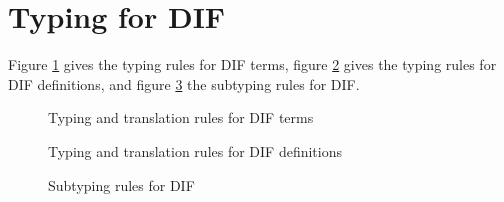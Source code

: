 \section{Typing for DIF}
Figure \ref{typing_rules_terms} gives the typing rules for DIF terms, figure
\ref{typing_rules_definitions} gives the typing rules for DIF definitions, and
figure \ref{subtyping_rules} the subtyping rules for DIF.

\begin{figure}[h]
    
    \caption{Typing and translation rules for DIF terms}
    \label{typing_rules_terms}
\end{figure}

\begin{figure}[h]
    
    \caption{Typing and translation rules for DIF definitions}
    \label{typing_rules_definitions}
\end{figure}

\begin{figure}[h]
    
    \caption{Subtyping rules for DIF}
    \label{subtyping_rules}
\end{figure}
